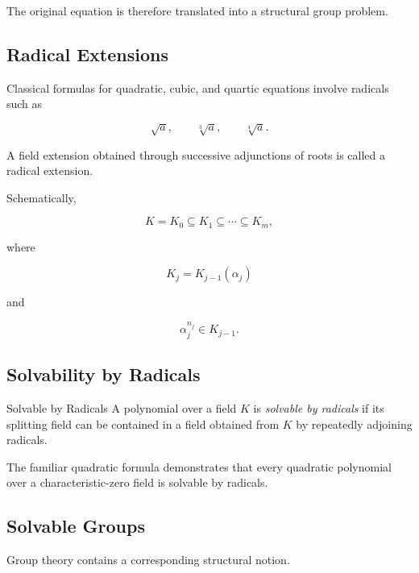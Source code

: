 The original equation is therefore translated into a structural group
problem.

\subsection{Radical Extensions}
\label{subsec:radical-extensions}

Classical formulas for quadratic, cubic, and quartic equations involve
radicals such as

\[ \sqrt{a},\qquad\sqrt[3]{a},\qquad\sqrt[4]{a}. \]

A field extension obtained through successive adjunctions of roots is called
a radical extension.

Schematically,

\[ K=K_0\subseteq K_1\subseteq\cdots\subseteq K_m, \]

where

\[ K_j=K_{j-1}(\alpha_j) \]

and

\[ \alpha_j^{n_j}\in K_{j-1}. \]

\subsection{Solvability by Radicals}
\label{subsec:solvability-radicals}

\begin{definitionbox}{Solvable by Radicals}
A polynomial over a field \(K\) is \emph{solvable by radicals} if its
splitting field can be contained in a field obtained from \(K\) by repeatedly
adjoining radicals.
\end{definitionbox}

The familiar quadratic formula demonstrates that every quadratic polynomial
over a characteristic-zero field is solvable by radicals.

\subsection{Solvable Groups}
\label{subsec:galois-solvable-groups}

Group theory contains a corresponding structural notion.

